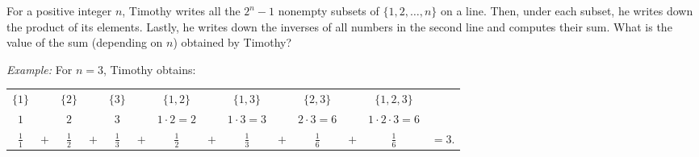 For a positive integer $n$,
Timothy writes all the $2^n-1$ nonempty subsets of $\{1,2, \ldots, n \}$ on a line.
Then, under each subset, he writes down the product of its elements.
Lastly, he writes down the inverses of all numbers in the second line and computes their sum.
What is the value of the sum (depending on $n$) obtained by Timothy?

\emph{Example:} For $n=3$, Timothy obtains:
\begin{center}
\begin{tabular}{c c c c c c c c c c c c c c}
$\{1\}$ && $\{2\}$ && $\{3\}$ && $\{1,2\}$ && $\{1,3\}$ && $\{2,3\}$ && $\{1,2,3\}$&\\[1mm]
$1$ && $2$ && $3$ && $1 \cdot 2 = 2$ && $1\cdot 3 = 3$ && $2\cdot 3 = 6$ && $1\cdot 2 \cdot 3 = 6$&\\[1mm]
\Large$\frac{1}{1}$ &$+$& \Large$\frac{1}{2}$ & $+$ & \Large$\frac{1}{3}$ & $+$ &\Large$\frac{1}{2}$ & $+$ & \Large$\frac{1}{3}$ & $+$ & \Large$\frac{1}{6}$ &$+$& \Large$\frac{1}{6}$& \large $= 3.$\\
\end{tabular}
\end{center}
